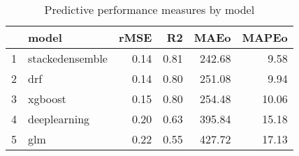 \begin{table}[ht]
\centering
\caption{Predictive performance measures by model} 
\label{comparo}
\begin{tabular}{rlrrrr}
  \hline
 & model & rMSE & R2 & MAEo & MAPEo \\ 
  \hline
1 & stackedensemble & 0.14 & 0.81 & 242.68 & 9.58 \\ 
  2 & drf & 0.14 & 0.80 & 251.08 & 9.94 \\ 
  3 & xgboost & 0.15 & 0.80 & 254.48 & 10.06 \\ 
  4 & deeplearning & 0.20 & 0.63 & 395.84 & 15.18 \\ 
  5 & glm & 0.22 & 0.55 & 427.72 & 17.13 \\ 
   \hline
\end{tabular}
\end{table}
